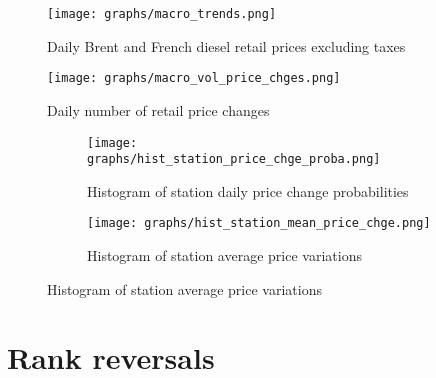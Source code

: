 \documentclass[english]{article}
\begin{document}
\newpage

\begin{figure}[H]
    \caption{Daily Brent and French diesel retail prices excluding taxes}
	\centering
		\texttt{[image: graphs/macro\_trends.png]}
\label{fig:macro_trends}
\end{figure}

\begin{figure}[H]
    \caption{Daily number of retail price changes}
	\centering
		\texttt{[image: graphs/macro\_vol\_price\_chges.png]}
\label{fig:macro_vol_price_chges}
\end{figure}

\begin{figure}[H]
\centering
\caption{Price changes by station)}
\begin{subfigure}{.4\linewidth}
\centering
\texttt{[image: graphs/hist\_station\_price\_chge\_proba.png]}
\caption[short]{Histogram of station daily price change probabilities}
\label{fig:hist_station_price_chge_proba}
\end{subfigure}
\begin{subfigure}{.4\linewidth}
\centering
\texttt{[image: graphs/hist\_station\_mean\_price\_chge.png]}
\caption[short]{Histogram of station average price variations}
\label{fig:hist_station_mean_price_chge}
\end{subfigure}
\end{figure}

\newpage

\section{Rank reversals}
\end{document}
